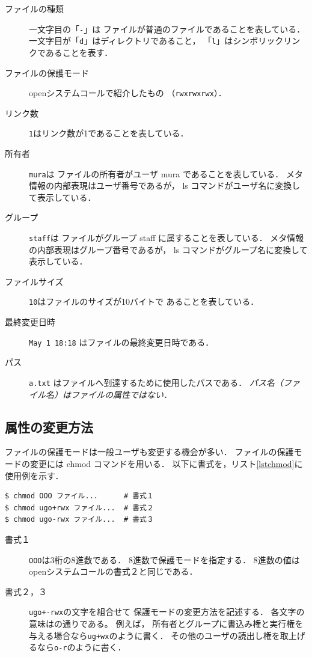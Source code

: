 \begin{description}
\item[ファイルの種類] 一文字目の「\texttt{-}」は
ファイルが普通のファイルであることを表している．
一文字目が「\texttt{d}」はディレクトリであること，
「\texttt{l}」はシンボリックリンクであることを表す．
\item[ファイルの保護モード] openシステムコールで紹介したもの
（\texttt{rwxrwxrwx}）．
\item[リンク数] \texttt{1}はリンク数が1であることを表している．
\item[所有者] \texttt{mura}は
ファイルの所有者がユーザ mura であることを表している．
メタ情報の内部表現はユーザ番号であるが，
ls コマンドがユーザ名に変換して表示している．
\item[グループ] \texttt{staff}は
ファイルがグループ staff に属することを表している．
メタ情報の内部表現はグループ番号であるが，
ls コマンドがグループ名に変換して表示している．
\item[ファイルサイズ] \texttt{10}はファイルのサイズが10バイトで
あることを表している．
\item[最終変更日時] \texttt{May 1 18:18} はファイルの最終変更日時である．
\item[パス] \texttt{a.txt} はファイルへ到達するために使用したパスである．
\emph{パス名（ファイル名）はファイルの属性ではない．}
\end{description}

\subsection{属性の変更方法}
ファイルの保護モードは一般ユーザも変更する機会が多い．
ファイルの保護モードの変更には chmod コマンドを用いる．
以下に書式を，リスト\ref{lstchmod}に使用例を示す．

\begin{lstlisting}[numbers=none]
$ chmod OOO ファイル...      # 書式１
$ chmod ugo+rwx ファイル...  # 書式２
$ chmod ugo-rwx ファイル...  # 書式３
\end{lstlisting}

\begin{description}
\item[書式１] \texttt{OOO}は3桁の8進数である．
8進数で保護モードを指定する．
8進数の値はopenシステムコールの書式２と同じである．

\item[書式２，３] \texttt{ugo+-rwx}の文字を組合せて
保護モードの変更方法を記述する．
各文字の意味はの通りである。
例えば，
所有者とグループに書込み権と実行権を与える場合なら\texttt{ug+wx}のように書く．
その他のユーザの読出し権を取上げるなら\texttt{o-r}のように書く．
\end{description}

